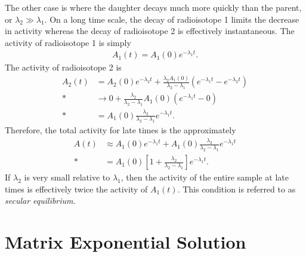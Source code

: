 The other case is where the daughter decays much more quickly than the parent, or $\lambda_2 \gg \lambda_1$. On a long time scale, the decay of radioisotope 1 limits the decrease in activity whereas the decay of radioisotope 2 is effectively instantaneous. The activity of radioisotope 1 is simply
\begin{align}
  A_1(t) = A_1(0) e^{-\lambda_1 t}.
\end{align}
The activity of radioisotope 2 is
\begin{align}
  A_2(t) &= A_2(0) e^{-\lambda_2 t} + \frac{\lambda_2 A_1(0)}{\lambda_2 - \lambda_1} \left( e^{- \lambda_1 t} -  e^{-\lambda_2 t} \right) \nonumber \\*
         &\rightarrow 0 + \frac{\lambda_2}{\lambda_2 - \lambda_1} A_1(0) \left( e^{- \lambda_1 t} - 0 \right) \nonumber \\*
         &= A_1(0) \frac{\lambda_2}{\lambda_2 - \lambda_1} e^{- \lambda_1 t}.
\end{align}
Therefore, the total activity for late times is the approximately
\begin{align}
  A(t) &\approx A_1(0) e^{-\lambda_1 t} + A_1(0) \frac{\lambda_2}{\lambda_2 - \lambda_1} e^{- \lambda_1 t} \nonumber \\*
       &= A_1(0) \left[ 1 +  \frac{\lambda_2}{\lambda_2 - \lambda_1} \right] e^{- \lambda_1 t}.
\end{align}
If $\lambda_2$ is very small relative to $\lambda_1$, then the activity of the entire sample at late times is effectively twice the activity of $A_1(t)$. This condition is referred to as \emph{secular equilibrium}.

\section{Matrix Exponential Solution}

